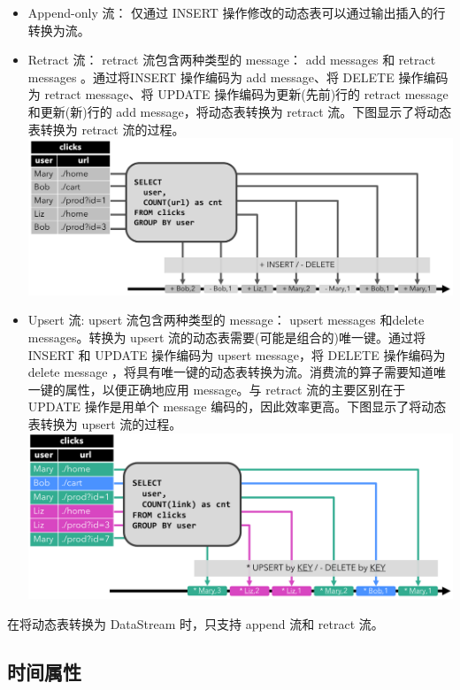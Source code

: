 \documentclass[cn,11pt,chinese]{elegantbook}
\providecommand{\tightlist}{%
  \setlength{\itemsep}{0pt}\setlength{\parskip}{0pt}}
\renewenvironment{quote}{\begin{customblockquote}\list{}{\rightmargin=0em\leftmargin=0em}%
\item\relax\color{blockquote-text}\ignorespaces}{\unskip\unskip\endlist\end{customblockquote}}
\begin{document}
\begin{itemize}
\tightlist
\item
  Append-only 流： 仅通过 INSERT
  操作修改的动态表可以通过输出插入的行转换为流。
\item
  Retract 流： retract 流包含两种类型的 message： add messages 和
  retract messages 。通过将INSERT 操作编码为 add message、将 DELETE
  操作编码为 retract message、将 UPDATE 操作编码为更新(先前)行的 retract
  message 和更新(新)行的 add message，将动态表转换为 retract
  流。下图显示了将动态表转换为 retract 流的过程。
  \includegraphics{images/undo-redo-mode.png}
\item
  Upsert 流: upsert 流包含两种类型的 message： upsert messages 和delete
  messages。转换为 upsert 流的动态表需要(可能是组合的)唯一键。通过将
  INSERT 和 UPDATE 操作编码为 upsert message，将 DELETE 操作编码为
  delete message
  ，将具有唯一键的动态表转换为流。消费流的算子需要知道唯一键的属性，以便正确地应用
  message。与 retract 流的主要区别在于 UPDATE 操作是用单个 message
  编码的，因此效率更高。下图显示了将动态表转换为 upsert 流的过程。
  \includegraphics{images/redo-mode.png}
\end{itemize}

\begin{quote}
在将动态表转换为 DataStream 时，只支持 append 流和 retract 流。
\end{quote}

\hypertarget{ux65f6ux95f4ux5c5eux6027}{%
\subsection{时间属性}\label{ux65f6ux95f4ux5c5eux6027}}
\end{document}
